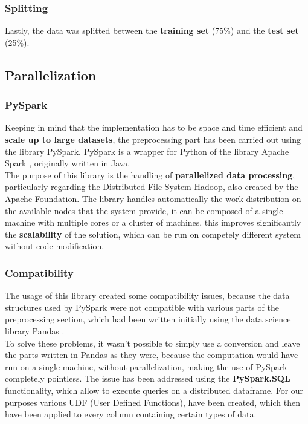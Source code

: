 \documentclass[
	letterpaper, %
	10pt, %
]{class}
\begin{document}
\subsubsection{Splitting}
Lastly, the data was splitted between the \textbf{training set} (75\%) and the \textbf{test set} (25\%).\\

\subsection{Parallelization}

\subsubsection{PySpark}
Keeping in mind that the implementation has to be space and time efficient and \textbf{scale up to large datasets}, the preprocessing part has been carried out using the library PySpark.
PySpark is a wrapper for Python of the library Apache Spark \cite{spark}, originally written in Java.\\

The purpose of this library is the handling of \textbf{parallelized data processing}, particularly regarding the Distributed File System Hadoop, also created by the Apache Foundation.
The library handles automatically the work distribution on the available nodes that the system provide, it can be composed of a single machine with multiple cores or a cluster of machines, this improves significantly the \textbf{scalability} of the solution, which can be run on competely different system without code modification.\\

\subsubsection{Compatibility}

The usage of this library created some compatibility issues, because the data structures used by PySpark were not compatible with various parts of the preprocessing section, which had been written initially using the data science library Pandas \cite{pandas}.\\

To solve these problems, it wasn't possible to simply use a conversion and leave the parts written in Pandas as they were, because the computation would have run on a single machine, without parallelization, making the use of PySpark completely pointless.
The issue has been addressed using the \textbf{PySpark.SQL} functionality, which allow to execute queries on a distributed dataframe. For our purposes various UDF (User Defined Functions), have been created, which then have been applied to every column containing certain types of data.\\
\end{document}
